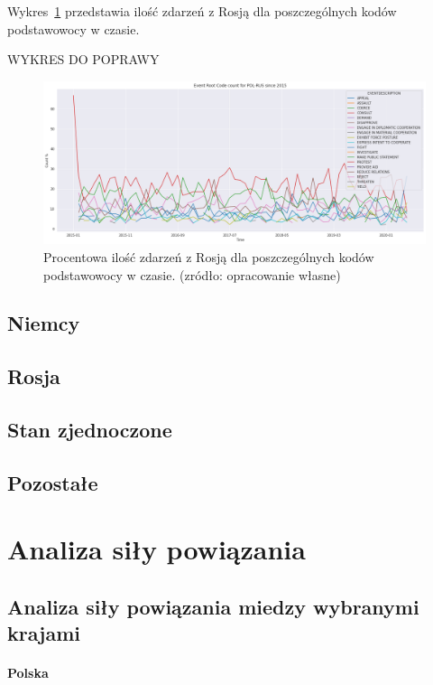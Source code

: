 \documentclass[11pt]{report}
\begin{document}
    Wykres~\ref{fig:PLRUSERC} przedstawia ilość zdarzeń z Rosją dla poszczególnych kodów podstawowocy w czasie.

    WYKRES DO POPRAWY
    \begin{figure}[ht]
        \centering
        \includegraphics[width=1 \textwidth]{fig/PL/POLRUSERCperc.png}
        \caption{Procentowa ilość zdarzeń z Rosją dla poszczególnych kodów podstawowocy w czasie. (zródło: opracowanie własne)}
        \label{fig:PLRUSERC}
    \end{figure}

    \subsection{Niemcy}

    \subsection{Rosja}

    \subsection{Stan zjednoczone}

    \subsection{Pozostałe}


    \section{Analiza siły powiązania}

    \subsection{Analiza siły powiązania miedzy wybranymi krajami}

    \paragraph{Polska}
\end{document}

